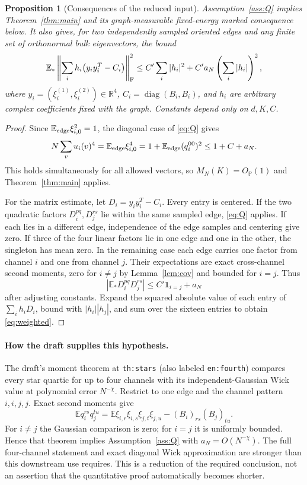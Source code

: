 \documentclass[11pt]{article}
\numberwithin{equation}{section}
\newtheorem{proposition}[theorem]{Proposition}
\theoremstyle{definition}
\theoremstyle{remark}
\newcommand{\R}{\mathbb R}
\newcommand{\E}{\mathbb E}
\newcommand{\PP}{\mathbb P}
\newcommand{\one}{\mathbf 1}
\begin{document}
\begin{proposition}[Consequences of the reduced input]\label{prop:Q}
Assumption~\ref{ass:Q} implies Theorem~\ref{thm:main} and its
graph-measurable fixed-energy marked consequence below. It also gives,
for two independently sampled oriented edges and any finite set of
orthonormal bulk eigenvectors, the bound
\begin{equation}\label{eq:weighted}
 \E_*\left\|\sum_i h_i\bigl(y_i y_i^T-C_i\bigr)\right\|_{\rm F}^2
 \leq C'\sum_i|h_i|^2+C'a_N\left(\sum_i|h_i|\right)^2,
\end{equation}
where $y_i=(\xi_i^{(1)},\xi_i^{(2)})\in\R^4$,
$C_i=\operatorname{diag}(B_i,B_i)$, and $h_i$ are arbitrary complex
coefficients fixed with the graph. Constants depend only on $d,K,C$.
\end{proposition}
\begin{proof}
Since $\E_{\rm edge}\xi_{i,0}^2=1$, the diagonal case of
\eqref{eq:Q} gives
\[
 N\sum_v u_i(v)^4
 =\E_{\rm edge}\xi_{i,0}^4
 =1+\E_{\rm edge}(q_i^{00})^2\leq1+C+a_N.
\]
This holds simultaneously for all allowed vectors, so
$M_N(K)=O_{\PP}(1)$ and Theorem~\ref{thm:main} applies.

For the matrix estimate, let $D_i=y_i y_i^T-C_i$. Every entry is centered.
If the two quadratic factors $D_i^{pq},D_j^{rs}$ lie within the same
sampled edge, \eqref{eq:Q} applies. If each lies in a different edge,
independence of the edge samples and centering give zero. If three
of the four linear factors lie in one edge and one in the other,
the singleton has mean zero. In the remaining case each edge carries
one factor from channel $i$ and one from channel $j$. Their expectations
are exact cross-channel second moments, zero for $i\ne j$ by
Lemma~\ref{lem:cov} and bounded for $i=j$. Thus
\[
 |\E_*D_i^{pq}D_j^{rs}|\leq C'\one_{i=j}+a_N
\]
after adjusting constants. Expand the squared absolute value of each
entry of $\sum_i h_iD_i$, bound with $|h_i||h_j|$, and sum over the
sixteen entries to obtain \eqref{eq:weighted}.
\end{proof}

\paragraph{How the draft supplies this hypothesis.}
The draft's moment theorem at \texttt{th:stars} (also labeled
\texttt{en:fourth}) compares
every star quartic for up to four channels with its independent-Gaussian
Wick value at polynomial error $N^{-\chi}$. Restrict to one edge and
the channel pattern $i,i,j,j$. Exact second moments give
\[
 \E q_i^{rs}q_j^{tu}
 =\E\xi_{i,r}\xi_{i,s}\xi_{j,t}\xi_{j,u}-(B_i)_{rs}(B_j)_{tu}.
\]
For $i\ne j$ the Gaussian comparison is zero; for $i=j$ it is uniformly
bounded. Hence that theorem implies Assumption~\ref{ass:Q} with
$a_N=O(N^{-\chi})$. The full four-channel statement and exact diagonal
Wick approximation are stronger than this downstream use requires.
This is a reduction of the required conclusion, not an assertion that
the quantitative proof automatically becomes shorter.
\end{document}
